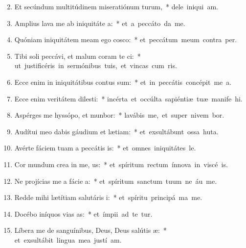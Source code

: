 \begin{flushleft}
\begin{enumerate}[leftmargin=*]
\setcounter{enumi}{1}


\item Et secúndum multitúdinem miseratiónum turum,~* \mbox{dele iniqui am.}
\item Amplius lava me ab iniquitáte a:~* \mbox{et a peccáto  da me.}
\item Quóniam iniquitátem meam ego cosco:~* \mbox{et peccátum meum contra   per.}
\item Tibi soli peccávi, et malum coram te ci:~* \mbox{ut justificéris in sermónibus tuis, et vincas cum ris.}
\item Ecce enim in iniquitátibus contus sum:~* \mbox{et in peccátis concépit me  a.}
\item Ecce enim veritátem dilesti:~* \mbox{incérta et occúlta sapiéntiæ tuæ manife hi.}
\item Aspérges me hyssópo, et munbor:~* \mbox{lavábis me, et super nivem bor.}
\item Audítui meo dabis gáudium et lætiam:~* \mbox{et exsultábunt ossa huta.}
\item Avérte fáciem tuam a peccátis is:~* \mbox{et omnes iniquitátes  le.}
\item Cor mundum crea in me, us:~* \mbox{et spíritum rectum ínnova in viscé is.}
\item Ne projícias me a fácie a:~* \mbox{et spíritum sanctum tuum ne áu  me.}
\item Redde mihi lætítiam salutáris i:~* \mbox{et spíritu principá ma me.}
\item Docébo iníquos vias as:~* \mbox{et ímpii ad te tur.}
\item Líbera me de sanguínibus, Deus, Deus salútis æ:~* \mbox{et exsultábit lingua mea justí am.}

\end{enumerate}
\end{flushleft}
